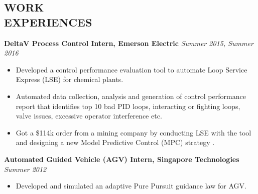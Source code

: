 \documentclass[margin, 9pt]{res} %
\begin{document}
\begin{resume}

\section{WORK\\ EXPERIENCES}

{\textbf{DeltaV Process Control Intern, Emerson Electric}} \hfill\textit{Summer 2015, Summer 2016}\\
\vspace*{-10pt}
\begin{itemize}[leftmargin=*] \itemsep -3pt
\vspace*{-5pt}
	\item Developed a control performance evaluation tool to automate Loop Service Express (LSE) for chemical plants.
	\item  Automated data collection, analysis and generation of control performance report that identifies top 10 bad PID loops, interacting or fighting  loops, valve issues, excessive operator interference etc.
    \item Got a \$114k  order from a mining company by conducting LSE with the tool and designing a new Model Predictive Control (MPC) strategy .
\end{itemize}

\medskip
{\textbf{Automated Guided Vehicle (AGV) Intern, Singapore Technologies}} \hfill\textit{Summer 2012}\\
\vspace*{-10pt}
\begin{itemize}[leftmargin=*] \itemsep -3pt
\vspace*{-5pt}
	\item Developed and simulated an adaptive Pure Pursuit guidance law for AGV.
\end{itemize}



\end{resume}
\end{document}
